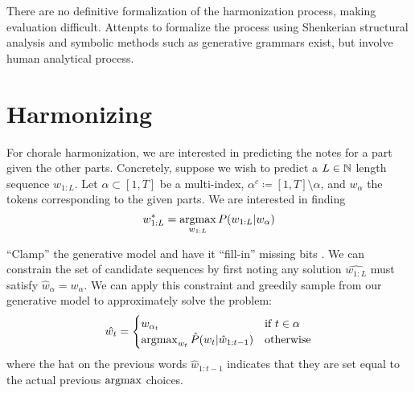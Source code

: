 \documentclass[dissertation.tex]{subfiles}
\begin{document}
There are no definitive formalization of the harmonization process, making
evaluation difficult. Attenpts to formalize the process using Shenkerian
structural analysis \cite{oswald1973harmony} and symbolic methods such as
generative grammars \cite{lerdahl1983jackendoff}\cite{winograd1968linguistics}
exist, but involve human analytical process.

\section{Harmonizing}


For chorale harmonization, we are interested in predicting the notes for a part
given the other parts. Concretely, suppose we wish to predict a $L \in \mathbb{N}$
length sequence $w_{1:L}$. Let $\alpha \subset [1,T]$ be a multi-index,
$\alpha^c \coloneqq [1,T] \setminus \alpha$, and $w_\alpha$ the tokens
corresponding to the given parts. We are interested in finding
\begin{equation}
  w_{1:L}^* = \operatorname*{argmax}_{w_{1:L}} P(w_{1:L} | w_{\alpha})
\end{equation}


``Clamp'' the generative model and have it ``fill-in'' missing bits
\cite{hinton1986learning}. We can constrain the set of candidate sequences by
first noting any solution $\hat{w_{1:L}}$ must satisfy $\hat{w}_\alpha =
w_\alpha$. We can apply this constraint and greedily sample from our generative
model to approximately solve the problem:
\begin{equation}
  \hat{w_{t}} = \begin{cases}
    w_{\alpha_t} &\mbox{if}~t \in \alpha \\
    \operatorname*{argmax}_{w_t} \hat{P}(w_t | \hat{w}_{1:t-1}) &\mbox{otherwise}
  \end{cases}
\end{equation}
where the hat on the previous words $\hat{w}_{1:t-1}$ indicates that they are
set equal to the actual previous $\operatorname*{argmax}$ choices.
\end{document}
